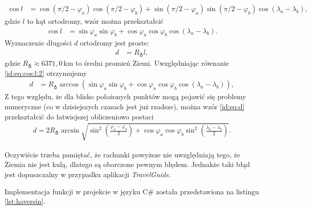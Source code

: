 \documentclass[a4paper]{book}
\newcommand{\appName}{\emph{TravelGuide}}
\begin{document}
			\begin{align}
			\cos l & = \cos (\pi/2 - \varphi_a) \cos (\pi/2 - \varphi_b) + \sin (\pi/2 - \varphi_a) \sin (\pi/2 - \varphi_b) \cos (\lambda_a - \lambda_b),
			\end{align}
			gdzie $l$ to kąt ortodromy, wzór można przekształcić
			\begin{align}
			\cos l & = \sin\varphi_a \sin \varphi_b + \cos\varphi_a \cos\varphi_b \cos (\lambda_a - \lambda_b).\label{id:eq:cos:l:2}						
			\end{align}
			Wyznaczenie długości $d$ ortodromy jest proste:
			\begin{align}
			d & =   R_{\earth} l,
			\end{align}
			gdzie $R_{\earth} \approx 6371{,}0\,$km to średni promień Ziemi.
			Uwzględniając równanie \eqref{id:eq:cos:l:2} otrzymujemy
			\begin{align}
		    d & =   R_{\earth} \arccos \left( \sin\varphi_a \sin \varphi_b + \cos\varphi_a \cos\varphi_b \cos (\lambda_a - \lambda_b) \right),\label{id:eq:d}
			\end{align}
			Z tego względu, że dla blisko położonych punktów mogą pojawić się problemy numeryczne (co w dzisiejszych czasach jest już rzadsze), można wzór \eqref{id:eq:d} przekształcić do łatwiejszej obliczeniowo postaci
			\begin{align}
			\label{id:eq:d-haversin}
            d = 2R_{\earth} \arcsin\sqrt{\sin^{2}\left(\frac{\varphi_a - \varphi_b}{2}\right) + \cos\varphi_a\cos\varphi_b\sin^{2}\left(\frac{\lambda_a - \lambda_b}{2}\right) }.
			\end{align}
						
			Oczywiście trzeba pamiętać, że rachunki powyższe nie uwzględniają tego, że Ziemia nie jest kulą, dlatego są obarczone pewnym błędem. Jednakże taki błąd jest dopuszczalny w przypadku aplikacji \appName.
			
		
		Implementacja funkcji w projekcie w języku C\# została przedstawiona na listingu \ref{lst:haversin}. 
		
\end{document}
